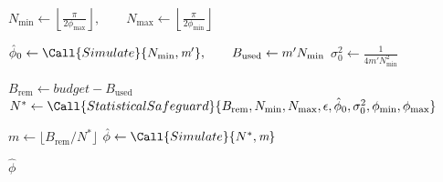 \begin{algorithm}
    \caption{Estimate $\phi$ by ``Reverse engineering'' $N$}
    \label{alg:reverse-engineering}
    \begin{algorithmic}
        \State $N_\text{min} \gets \left\lfloor\frac{\pi}{2 \phi_\text{max}}\right\rfloor,
            \qquad N_\text{max} \gets \left\lfloor\frac{\pi}{2 \phi_\text{min}}\right\rfloor$

        \State $\hat \phi_0 \gets \Call{Simulate}{N_\text{min}, \textit{m}'},
            \qquad B_\text{used} \gets m' N_\text{min}$
        \State $\sigma_0^2 \gets \frac{1}{4m'N_\text{min}^2}$

        \State $B_\text{rem} \gets \textit{budget} - B_\text{used}$
        \State $N^* \gets \Call{StatisticalSafeguard}{B_\text{rem}, N_\text{min}, N_\text{max}, \epsilon, \hat\phi_0, \sigma_0^2, \phi_\text{min}, \phi_\text{max}}$


        \State $m \gets \lfloor B_\text{rem} / N^*\rfloor$
        \State $\hat \phi \gets \Call{Simulate}{N^*, \textit{m}}$

        \State \Return $\hat\phi$

        \EndProcedure
    \end{algorithmic}
\end{algorithm}
